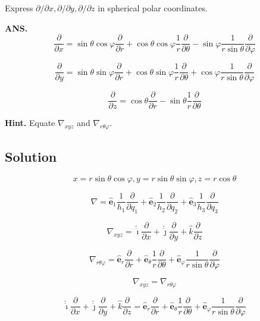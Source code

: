 \documentclass[12pt]{article}
\begin{document}
Express \(\partial/\partial x, \partial/\partial y, \partial/\partial z\) in spherical polar coordinates.

\bigskip

\textbf{ANS.}
\[
    \frac{\partial}{\partial x} = \sin{\theta} \cos{\varphi} \frac{\partial}{\partial r}
    + \cos{\theta} \cos{\varphi} \frac{1}{r} \frac{\partial}{\partial \theta}
    - \sin{\varphi} \frac{1}{r \sin{\theta}} \frac{\partial}{\partial \varphi}
\]

\[
    \frac{\partial}{\partial y} = \sin{\theta} \sin{\varphi} \frac{\partial}{\partial r}
    + \cos{\theta} \sin{\varphi} \frac{1}{r} \frac{\partial}{\partial \theta}
    + \cos{\varphi} \frac{1}{r \sin{\theta}} \frac{\partial}{\partial \varphi}
\]

\[
    \frac{\partial}{\partial z} = \cos{\theta} \frac{\partial}{\partial r}
    - \sin{\theta} \frac{1}{r} \frac{\partial}{\partial \theta}
\]

\bigskip

\textbf{Hint.} Equate \(\nabla_{xyz}\) and \(\nabla_{r \theta \varphi }\).

\subsection{Solution}

\[
    x = r \sin{\theta} \cos{\varphi}, y = r \sin{\theta} \sin{\varphi}, z = r \cos{\theta}
\]

\[
    \nabla = \hat{\textbf{e}}_1 \frac{1}{h_1} \frac{\partial}{\partial q_1}
    + \hat{\textbf{e}}_2 \frac{1}{h_2} \frac{\partial}{\partial q_2}
    + \hat{\textbf{e}}_3 \frac{1}{h_3} \frac{\partial}{\partial q_3}
\]

\[
    \nabla_{xyz} =  \hat{\dot{\imath}} \frac{\partial}{\partial x}
    + \hat{\dot{\jmath}} \frac{\partial}{\partial y}
    +  \hat{k} \frac{\partial}{\partial z}
\]

\[
    \nabla_{r \theta \varphi } = \hat{\textbf{e}}_r \frac{\partial}{\partial r}
    + \hat{\textbf{e}}_\theta \frac{1}{r} \frac{\partial}{\partial \theta}
    + \hat{\textbf{e}}_\varphi \frac{1}{r \sin{\theta}} \frac{\partial}{\partial \varphi}
\]

\[
    \nabla_{xyz} = \nabla_{r \theta \varphi }
\]

\[
    \hat{\dot{\imath}} \frac{\partial}{\partial x}
    + \hat{\dot{\jmath}} \frac{\partial}{\partial y}
    +  \hat{k} \frac{\partial}{\partial z} = \hat{\textbf{e}}_r \frac{\partial}{\partial r}
    + \hat{\textbf{e}}_\theta \frac{1}{r} \frac{\partial}{\partial \theta}
    + \hat{\textbf{e}}_\varphi \frac{1}{r \sin{\theta}} \frac{\partial}{\partial \varphi}
\]
\end{document}
